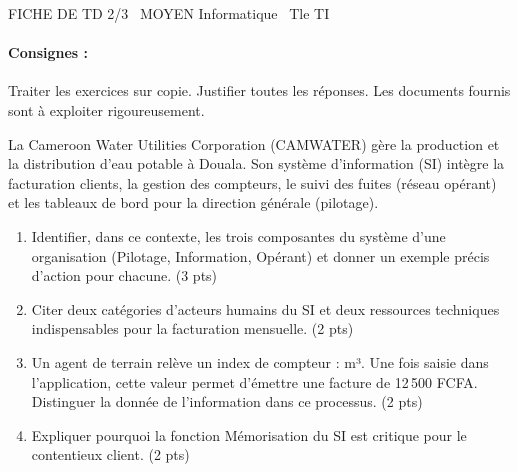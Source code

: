 \documentclass[11pt]{article}
\begin{document}
\begin{tcolorbox}[enhanced,colback=popink,colframe=popink,arc=10pt,boxrule=0pt,left=12pt,right=12pt,top=9pt,bottom=9pt]
{\color{white}\popxbold\small FICHE DE TD 2/3 \textbullet\ MOYEN \hfill Informatique \textbullet\ Tle TI\par}
\end{tcolorbox}
\vspace{4pt}
\paragraph{Consignes :} Traiter les exercices sur copie. Justifier toutes les réponses. Les documents fournis sont à exploiter rigoureusement.

\begin{exercice}
La Cameroon Water Utilities Corporation (CAMWATER) gère la production et la distribution d'eau potable à Douala. Son système d'information (SI) intègre la facturation clients, la gestion des compteurs, le suivi des fuites (réseau opérant) et les tableaux de bord pour la direction générale (pilotage).

\begin{enumerate}
    \item Identifier, dans ce contexte, les trois composantes du système d'une organisation (Pilotage, Information, Opérant) et donner un exemple précis d'action pour chacune. \hfill (3 pts)
    \item Citer deux catégories d'acteurs humains du SI et deux ressources techniques indispensables pour la facturation mensuelle. \hfill (2 pts)
    \item Un agent de terrain relève un index de compteur :  m³\fg. Une fois saisie dans l'application, cette valeur permet d'émettre une facture de 12\,500 FCFA. Distinguer la \og donnée\fg{} de l'\og information\fg{} dans ce processus. \hfill (2 pts)
    \item Expliquer pourquoi la fonction \og Mémorisation \fg{} du SI est critique pour le contentieux client. \hfill (2 pts)
\end{enumerate}
\end{exercice}
\end{document}
